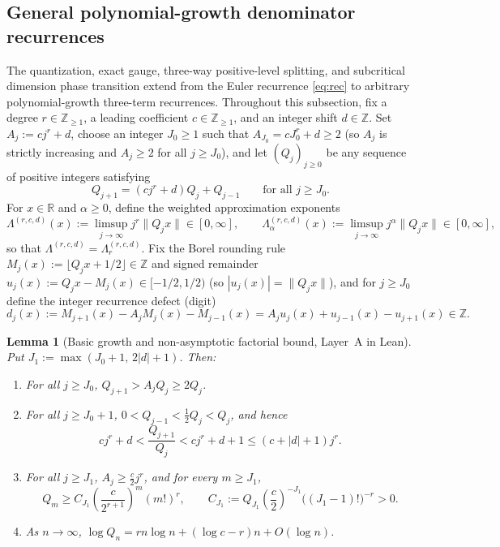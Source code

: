 \documentclass[11pt]{article}
\newtheorem{lemma}[theorem]{Lemma}
\theoremstyle{definition}
\theoremstyle{remark}
\newcommand{\R}{\mathbb{R}}
\newcommand{\Z}{\mathbb{Z}}
\newcommand{\Lam}{\Lambda}
\begin{document}
\subsection{General polynomial-growth denominator recurrences}\label{sec:poly-rec}

The quantization, exact gauge, three-way positive-level splitting, and
subcritical dimension phase transition extend from the Euler recurrence
\eqref{eq:rec} to arbitrary polynomial-growth three-term recurrences. Throughout
this subsection, fix a degree $r\in\Z_{\ge1}$, a leading coefficient
$c\in\Z_{\ge1}$, and an integer shift $d\in\Z$. Set $A_j:=cj^r+d$, choose an
integer $J_0\ge1$ such that $A_{J_0}=cJ_0^r+d\ge2$ (so $A_j$ is strictly
increasing and $A_j\ge2$ for all $j\ge J_0$), and let $(Q_j)_{j\ge0}$ be any
sequence of positive integers satisfying
\begin{equation}\label{eq:poly-rec}
Q_{j+1}=(cj^r+d)Q_j+Q_{j-1}\qquad\text{for all }j\ge J_0.
\end{equation}
For $x\in\R$ and $\alpha\ge0$, define the weighted approximation exponents
\[
\Lam^{(r,c,d)}(x):=\limsup_{j\to\infty}j^r\|Q_jx\|\in[0,\infty],\qquad
\Lam_\alpha^{(r,c,d)}(x):=\limsup_{j\to\infty}j^\alpha\|Q_jx\|\in[0,\infty],
\]
so that $\Lam^{(r,c,d)}=\Lam_r^{(r,c,d)}$. Fix the Borel rounding rule
$M_j(x):=\lfloor Q_jx+1/2\rfloor\in\Z$ and signed remainder
$u_j(x):=Q_jx-M_j(x)\in[-1/2,1/2)$ (so $|u_j(x)|=\|Q_jx\|$), and for $j\ge J_0$
define the integer recurrence defect (digit)
\begin{equation}\label{eq:poly-defect-id}
d_j(x):=M_{j+1}(x)-A_jM_j(x)-M_{j-1}(x)=A_ju_j(x)+u_{j-1}(x)-u_{j+1}(x)\in\Z.
\end{equation}

\begin{lemma}[Basic growth and non-asymptotic factorial bound, Layer~A in Lean]\label{lem:poly-growth}
Put $J_1:=\max(J_0+1,\,2|d|+1)$. Then:
\begin{enumerate}[label=(\roman*),leftmargin=2em]
\item For all $j\ge J_0$, $Q_{j+1}>A_jQ_j\ge2Q_j$.
\item For all $j\ge J_0+1$, $0<Q_{j-1}<\frac12Q_j<Q_j$, and hence
\[
cj^r+d<\frac{Q_{j+1}}{Q_j}<cj^r+d+1\le(c+|d|+1)j^r.
\]
\item For all $j\ge J_1$, $A_j\ge\frac{c}{2}j^r$, and for every $m\ge J_1$,
\[
Q_m\ge C_{J_1}\left(\frac{c}{2^{r+1}}\right)^m(m!)^r,\qquad
C_{J_1}:=Q_{J_1}\left(\frac{c}{2}\right)^{-J_1}\bigl((J_1-1)!\bigr)^{-r}>0.
\]
\item As $n\to\infty$, $\log Q_n=rn\log n+(\log c-r)n+O(\log n)$.
\end{enumerate}
\end{lemma}
\end{document}
